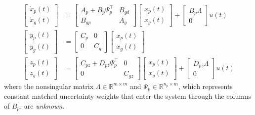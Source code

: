 \begin{equation}
  \label{eqn.wholeSystemUncertain}
  \begin{split}
    \begin{bmatrix}
      \dot{x}_{p}(t) \\
      \dot{x}_{g}(t)
    \end{bmatrix}
    &=
    \begin{bmatrix}
      A_{p}+B_{p}\Psi_{p}^{\top} & B_{gd} \\
      B_{gp} & A_{g}
    \end{bmatrix}
    \begin{bmatrix}
      x_{p}(t) \\
      x_{g}(t)
    \end{bmatrix}
    +
    \begin{bmatrix}
      B_{p}\Lambda \\
      0
    \end{bmatrix}
    u(t) \\
    \begin{bmatrix}
      y_{p}(t) \\
      y_{g}(t)
    \end{bmatrix}
    &=
    \begin{bmatrix}
      C_{p} & 0 \\
      0 & C_{g}
    \end{bmatrix}
    \begin{bmatrix}
      x_{p}(t) \\
      x_{g}(t)
    \end{bmatrix} \\
    \begin{bmatrix}
      z_{p}(t) \\
      z_{g}(t)
    \end{bmatrix}
    &=
    \begin{bmatrix}
      C_{pz}+D_{pz}\Psi_{p}^{\top} & 0 \\
      0 & C_{gz}
    \end{bmatrix}
    \begin{bmatrix}
      x_{p}(t) \\
      x_{g}(t)
    \end{bmatrix}
    +
    \begin{bmatrix}
      D_{pz}\Lambda \\
      0
    \end{bmatrix}
    u(t)
  \end{split}
\end{equation}
where the nonsingular matrix $\Lambda\in\mathbb{R}^{m\times m}$ and $\Psi_{p}\in\mathbb{R}^{n_{p}\times m}$, which represents constant matched uncertainty weights that enter the system through the columns of $B_{p}$, are \textit{unknown}.
